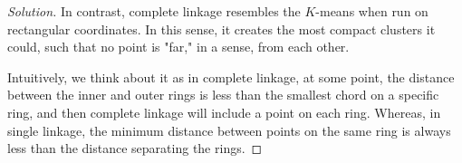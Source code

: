 \documentclass[10pt]{article}
\begin{document}
\begin{proof}[Solution]
In contrast, complete linkage resembles the $K$-means when run on rectangular coordinates. In this sense, it creates the most compact clusters it could, such that no point is "far," in a sense, from each other.

Intuitively, we think about it as in complete linkage, at some point, the distance between the inner and outer rings is less than the smallest chord on a specific ring, and then complete linkage will include a point on each ring. Whereas, in single linkage, the minimum distance between points on the same ring is always less than the distance separating the rings.

\end{proof}
\end{document}
